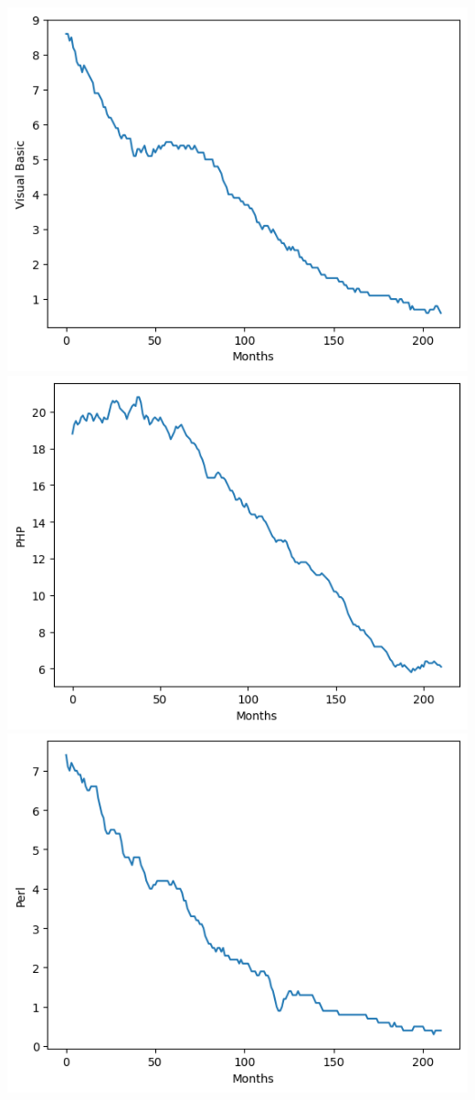\documentclass[conference]{IEEEtran}
\begin{document}
\includegraphics[scale=0.4]{lineplot/visualbasic.png}
\includegraphics[scale=0.4]{lineplot/php.png}
\includegraphics[scale=0.4]{lineplot/perl.png}
\end{document}
